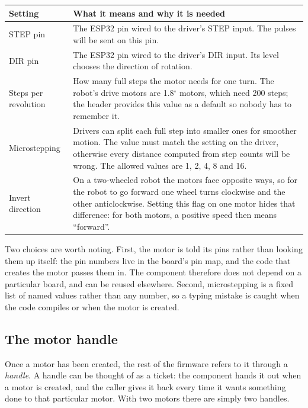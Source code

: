 \begin{center}
\begin{tabularx}{\linewidth}{@{}l X@{}}
\toprule
\textbf{Setting} & \textbf{What it means and why it is needed} \\
\midrule
STEP pin & The ESP32 pin wired to the driver's STEP input. The pulses will be sent on this pin. \\
DIR pin & The ESP32 pin wired to the driver's DIR input. Its level chooses the direction of rotation. \\
Steps per revolution & How many full steps the motor needs for one turn. The robot's drive motors are 1.8$^\circ$ motors, which need 200 steps; the header provides this value as a default so nobody has to remember it. \\
Microstepping & Drivers can split each full step into smaller ones for smoother motion. The value must match the setting on the driver, otherwise every distance computed from step counts will be wrong. The allowed values are 1, 2, 4, 8 and 16. \\
Invert direction & On a two-wheeled robot the motors face opposite ways, so for the robot to go forward one wheel turns clockwise and the other anticlockwise. Setting this flag on one motor hides that difference: for both motors, a positive speed then means ``forward''. \\
\bottomrule
\end{tabularx}
\end{center}

Two choices are worth noting. First, the motor is told its pins rather than looking them up itself: the pin numbers live in the board's pin map, and the code that creates the motor passes them in. The component therefore does not depend on a particular board, and can be reused elsewhere. Second, microstepping is a fixed list of named values rather than any number, so a typing mistake is caught when the code compiles or when the motor is created.

\subsection{The motor handle}
Once a motor has been created, the rest of the firmware refers to it through a \emph{handle}. A handle can be thought of as a ticket: the component hands it out when a motor is created, and the caller gives it back every time it wants something done to that particular motor. With two motors there are simply two handles.

